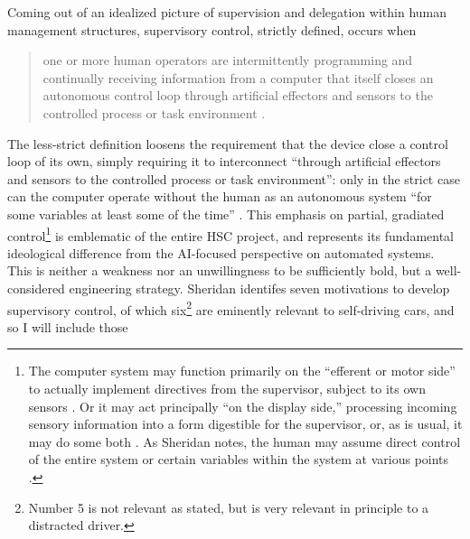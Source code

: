 
Coming out of an idealized picture of supervision and delegation
within human management structures, supervisory control, strictly defined, occurs when
\begin{quote}one or more human operators are intermittently
  programming and continually receiving information from a computer
  that itself closes an autonomous control loop through artificial
  effectors and sensors to the controlled process or task
  environment \cite[p. 1]{sheridan}.\end{quote}
The less-strict definition loosens the requirement that the device
close a control loop of its own, simply requiring it to interconnect
``through artificial effectors and sensors to the controlled process
or task environment'':  only in the strict case can the computer
operate without the human as an autonomous system ``for some
variables at least some of the time'' \cite[p. 1]{sheridan}. This
emphasis on partial, gradiated control\footnote{The computer system
  may function primarily on the ``efferent or motor side'' to actually
implement directives from the supervisor, subject to its own
sensors \cite[p. 3]{sheridan}. Or it may act principally ``on the
display side,'' processing incoming sensory information into a form
digestible for the supervisor, or, as is usual, it may do some
both \cite[p. 3]{sheridan}. As Sheridan notes, the human
may assume direct control of the entire system or certain variables
within the system at various points \cite[p. 3]{sheridan}.} is
emblematic of the entire HSC 
project, and represents its fundamental ideological difference from
the AI-focused perspective on automated systems. This is neither a
weakness nor an unwillingness to be sufficiently bold, but a
well-considered engineering strategy. Sheridan identifes seven
motivations to develop supervisory control, of which
six\footnote{Number 5 is not relevant as stated, but is very relevant
  in principle to a distracted driver.} are
eminently relevant to self-driving cars, and so I will include those
